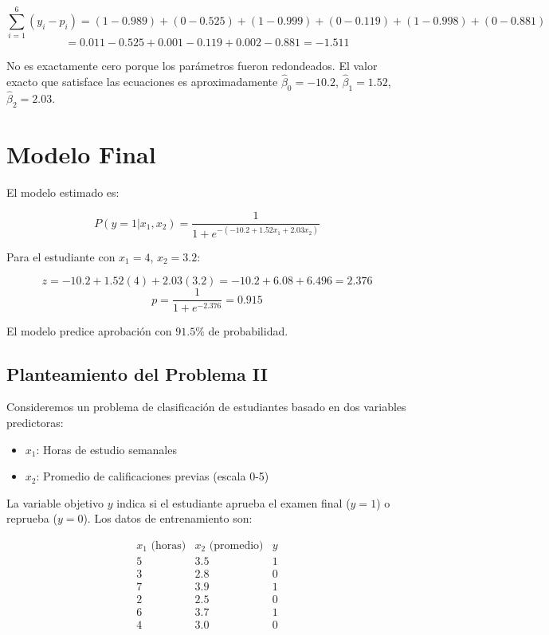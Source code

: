 \documentclass[12pt]{article}
\begin{document}
\[
\sum_{i=1}^{6} (y_i - p_i) = (1-0.989) + (0-0.525) + (1-0.999) + (0-0.119) + (1-0.998) + (0-0.881)
\]
\[
= 0.011 - 0.525 + 0.001 - 0.119 + 0.002 - 0.881 = -1.511
\]

No es exactamente cero porque los parámetros fueron redondeados. El valor exacto que satisface las ecuaciones es aproximadamente $\hat{\beta}_0 = -10.2$, $\hat{\beta}_1 = 1.52$, $\hat{\beta}_2 = 2.03$.

\section{Modelo Final}

El modelo estimado es:

\[
P(y=1|x_1, x_2) = \frac{1}{1 + e^{-(-10.2 + 1.52x_1 + 2.03x_2)}}
\]

Para el estudiante con $x_1=4$, $x_2=3.2$:

\[
z = -10.2 + 1.52(4) + 2.03(3.2) = -10.2 + 6.08 + 6.496 = 2.376
\]
\[
p = \frac{1}{1 + e^{-2.376}} = 0.915
\]

El modelo predice aprobación con $91.5\%$ de probabilidad.

\subsection{Planteamiento del Problema II}

Consideremos un problema de clasificación de estudiantes basado en dos variables predictoras:
\begin{itemize}
\item $x_1$: Horas de estudio semanales
\item $x_2$: Promedio de calificaciones previas (escala 0-5)
\end{itemize}

La variable objetivo $y$ indica si el estudiante aprueba el examen final ($y=1$) o reprueba ($y=0$). Los datos de entrenamiento son:

\[
\begin{array}{c|c|c}
x_1 \text{ (horas)} & x_2 \text{ (promedio)} & y \\
\hline
5 & 3.5 & 1 \\
3 & 2.8 & 0 \\
7 & 3.9 & 1 \\
2 & 2.5 & 0 \\
6 & 3.7 & 1 \\
4 & 3.0 & 0 \\
\end{array}
\]
\end{document}
